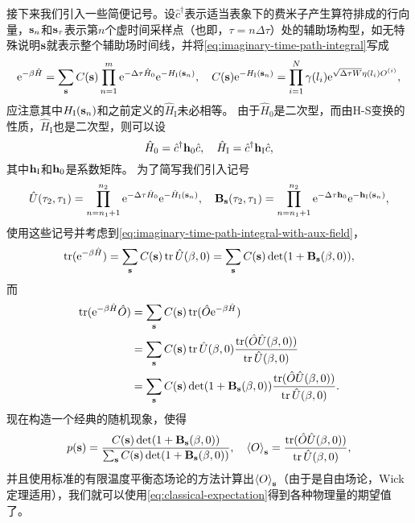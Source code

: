 \documentclass[hyperref, UTF8, a4paper]{ctexart}
\newcommand*{\ee}{\mathrm{e}}
\begin{document}
接下来我们引入一些简便记号。设$\hat{c}^\dagger$表示适当表象下的费米子产生算符排成的行向量，$\vb{s}_n$和$\vb{s}_\tau$表示第$n$个虚时间采样点（也即，$\tau=n\Delta \tau$）处的辅助场构型，如无特殊说明$\vb{s}$就表示整个辅助场时间线，并将\eqref{eq:imaginary-time-path-integral}写成
\begin{equation}
    \ee^{-\beta \hat{H}} = \sum_{\vb{s}} C(\vb{s}) \prod_{n=1}^m \ee^{-\Delta \tau \hat{H}_0} \ee^{-H_\text{I}(\vb{s}_n)}, \quad C(\vb{s}) \ee^{-H_\text{I}(\vb{s}_n)} = \prod_{i=1}^N \gamma(l_i) \ee^{\sqrt{\Delta \tau W} \eta(l_i) O^{(i)}},
    \label{eq:o2-path-integral}
\end{equation}
应注意其中$H_\text{I}(\vb{s}_n)$和之前定义的$\hat{H}_\text{I}$未必相等。
由于$\hat{H}_0$是二次型，而由H-S变换的性质，$\hat{H}_\text{I}$也是二次型，则可以设
\begin{equation}
    \hat{H}_0 = \hat{c}^\dagger \vb{h}_0 \hat{c}, \quad \hat{H}_\text{I} = \hat{c}^\dagger \vb{h}_\text{I} \hat{c},
\end{equation}
其中$\vb{h}_\text{I}$和$\vb{h}_0$是系数矩阵。
为了简写我们引入记号
\begin{equation}
    \hat{U}(\tau_2, \tau_1) = \prod_{n=n_1+1}^{n_2} \ee^{-\Delta \tau \hat{H}_0} \ee^{- \hat{H}_\text{I}(\vb{s}_n)}, \quad \vb{B}_{\vb{s}}(\tau_2, \tau_1) = \prod_{n=n_1+1}^{n_2} \ee^{-\Delta \tau \vb{h}_0} \ee^{-\vb{h}_\text{I}(\vb{s}_n)},
\end{equation}
使用这些记号并考虑到\eqref{eq:imaginary-time-path-integral-with-aux-field}，
\[
    \trace(\ee^{-\beta \hat{H}}) = \sum_{\vb{s}} C(\vb{s}) \trace \hat{U}(\beta, 0) = \sum_{\vb{s}} C(\vb{s}) \det(1 + \vb{B}_{\vb{s}}(\beta, 0)),
\]
而
\[
    \begin{aligned}
        \trace(\ee^{-\beta \hat{H}} \hat{O}) &= \sum_{\vb{s}} C(\vb{s}) \trace(\hat{O} \ee^{-\beta \hat{H}}) \\
        &= \sum_{\vb{s}} C(\vb{s}) \trace\hat{U}(\beta, 0) \frac{\trace(\hat{O} \hat{U}(\beta, 0))}{\trace \hat{U}(\beta, 0)} \\
        &= \sum_{\vb{s}} C(\vb{s}) \det(1 + \vb{B}_{\vb{s}}(\beta, 0)) \frac{\trace(\hat{O} \hat{U}(\beta, 0))}{\trace \hat{U}(\beta, 0)}.
    \end{aligned} 
\]
现在构造一个经典的随机现象，使得
\begin{equation}
    p(\vb{s}) = \frac{ C(\vb{s}) \det(1 + \vb{B}_{\vb{s}}(\beta, 0))}{\sum_{\vb{s}} C(\vb{s}) \det(1 + \vb{B}_{\vb{s}}(\beta, 0))}, \quad \expval{O}_{\vb{s}} = \frac{\trace(\hat{O} \hat{U}(\beta, 0))}{\trace \hat{U}(\beta, 0)},
\end{equation}
并且使用标准的有限温度平衡态场论的方法计算出$\expval{O}_{\vb{s}}$（由于是自由场论，Wick定理适用），我们就可以使用\eqref{eq:classical-expectation}得到各种物理量的期望值了。
\end{document}

